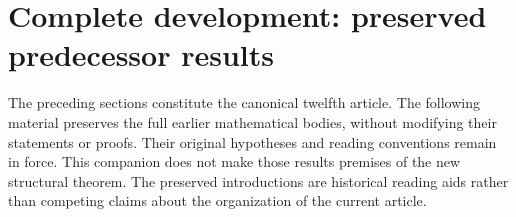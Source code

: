 \newif\ifcomplete\completetrue


\clearpage
\section*{Complete development: preserved predecessor results}
The preceding sections constitute the canonical twelfth article.
The following material preserves the full earlier mathematical bodies,
without modifying their statements or proofs. Their original hypotheses
and reading conventions remain in force. This companion does not make
those results premises of the new structural theorem. The preserved
introductions are historical reading aids rather than competing claims
about the organization of the current article.























